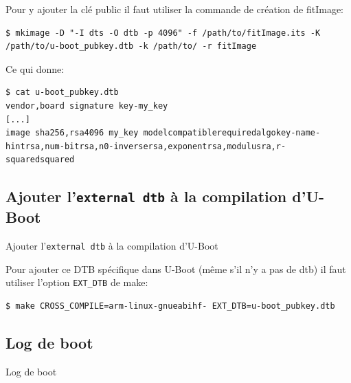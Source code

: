 \documentclass[aspectratio=169]{beamer}
\begin{document}
\begin{frame}[fragile]
Pour y ajouter la clé public il faut utiliser la commande de création de fitImage:
\begin{lstlisting}[style=shell]
$ mkimage -D "-I dts -O dtb -p 4096" -f /path/to/fitImage.its -K /path/to/u-boot_pubkey.dtb -k /path/to/ -r fitImage
\end{lstlisting}
Ce qui donne:
\begin{lstlisting}[style=shell]
$ cat u-boot_pubkey.dtb
vendor,board signature key-my_key
[...]
image sha256,rsa4096 my_key modelcompatiblerequiredalgokey-name-hintrsa,num-bitrsa,n0-inversersa,exponentrsa,modulusra,r-squaredsquared
\end{lstlisting}     
\end{frame}


\subsection{Ajouter l'\texttt{external dtb} à la compilation d'U-Boot}

\begin{frame}
\begin{center}
\large{Ajouter l'\texttt{external dtb} à la compilation d'U-Boot}
\end{center}
\end{frame}

\begin{frame}[fragile]
Pour ajouter ce DTB spécifique dans U-Boot (même s'il n'y a pas de dtb) il faut utiliser l'option \texttt{EXT\_DTB} de make:
\begin{lstlisting}[style=shell]
$ make CROSS_COMPILE=arm-linux-gnueabihf- EXT_DTB=u-boot_pubkey.dtb
\end{lstlisting}
\end{frame}


\subsection{Log de boot}

\begin{frame}
\begin{center}
\large{Log de boot}
\end{center}
\end{frame}
\end{document}
